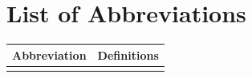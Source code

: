 \chapter*{List of Abbreviations}

\begin{longtable}{|p{3cm}|p{7cm}|} %
\hline
\textbf{Abbreviation} & \textbf{Definitions} \\
\hline
& \\
\hline


\end{longtable}





